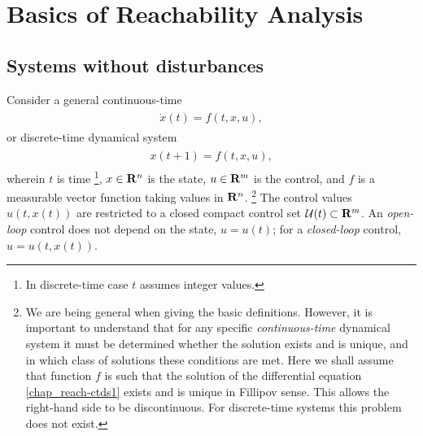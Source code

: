 \documentclass[letterpaper,10pt,english]{sphinxmanual}
\begin{document}
\section{Basics of Reachability Analysis}
\label{chap_reach:basics-of-reachability-analysis}

\subsection{Systems without disturbances}
\label{chap_reach:systems-without-disturbances}
Consider a general continuous-time
\label{chap_reach:equation-ctds1}\begin{gather}
\begin{split}\dot{x}(t) = f(t, x, u),\end{split}\label{chap_reach-ctds1}
\end{gather}
or discrete-time dynamical system
\label{chap_reach:equation-dtds1}\begin{gather}
\begin{split}x(t+1) = f(t, x, u),\end{split}\label{chap_reach-dtds1}
\end{gather}
wherein $t$ is time \footnote{
In discrete-time case $t$ assumes integer values.
}, $x\in{\bf R}^n$ is the state,
$u\in{\bf R}^m$ is the control, and $f$ is a measurable
vector function taking values in ${\bf R}^n$. \footnote{
We are being general when giving the basic definitions. However, it
is important to understand that for any specific \emph{continuous-time}
dynamical system it must be determined whether the solution exists
and is unique, and in which class of solutions these conditions are
met. Here we shall assume that function $f$ is such that the
solution of the differential equation \eqref{chap_reach-ctds1} exists and is unique
in Fillipov sense. This allows the right-hand side to be
discontinuous. For discrete-time systems this problem does not exist.
} The control
values $u(t, x(t))$ are restricted to a closed compact control set
${\mathcal U}(t)\subset{\bf R}^m$. An \emph{open-loop} control does not
depend on the state, $u=u(t)$; for a \emph{closed-loop} control,
$u=u(t, x(t))$.
\end{document}

